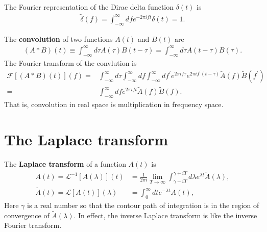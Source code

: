 The Fourier representation of the Dirac delta function $\delta\left(t\right)$ is
\begin{align}
    \tilde{\delta}\left(f\right)
    =
    \int_{-\infty}^{\infty}df e^{- 2\pi i f t} \delta\left(t\right)
    =
    1
    .
\end{align}

The \textbf{convolution} of two functions $A(t)$ and $B(t)$ are
\begin{align}
    \left(A* B\right)\left(t\right)
    \equiv
    \int_{-\infty}^{\infty}d\tau A\left(\tau\right)B\left(t-\tau\right)
    = 
    \int_{-\infty}^{\infty}d\tau A\left(t-\tau\right)B\left(\tau\right)
    .
\end{align}
The Fourier transform of the convlution is
\begin{align}
    \mathcal{F}\left[\left(A* B\right)\left(t\right)\right]\left(f\right)
    =&
    \int_{-\infty}^{\infty}d\tau \int_{-\infty}^{\infty}df \int_{-\infty}^{\infty}df^{\prime}
        e^{2\pi i f\tau} e^{2\pi i f^{\prime}\left(t-\tau\right)}
        \tilde{A}\left(f\right)\tilde{B}\left(f^{\prime}\right)
    \nonumber\\
    =&
    \int_{-\infty}^{\infty}df e^{2\pi i ft}
        \tilde{A}\left(f\right)\tilde{B}\left(f\right)
    .
\end{align}
That is, convolution in real space is multiplication in frequency space.

\section{The Laplace transform}

The \textbf{Laplace transform} of a function $A(t)$ is
\begin{subequations}
\begin{align}
    A\left(t\right)
    =
    \mathcal{L}^{-1}\left[A\left(\lambda\right)\right]\left(t\right)
    &=
    \frac{1}{2\pi i}\lim_{T\to\infty}
    \int_{\gamma-iT}^{\gamma+iT}d\lambda e^{\lambda t}\tilde{A}\left(\lambda\right)
    ,\\
    \tilde{A}\left(t\right)
    =
    \mathcal{L}\left[A\left(t\right)\right]\left(\lambda\right)
    &=
    \int_0^{\infty}dte^{-\lambda t}A\left(t\right)
    ,
\end{align}
\end{subequations}
Here $\gamma$ is a real number so that the contour path of integration is in
the region of convergence of $\tilde{A}\left(\lambda\right)$.
In effect, the inverse Laplace transform is like the inverse Fourier transform.
